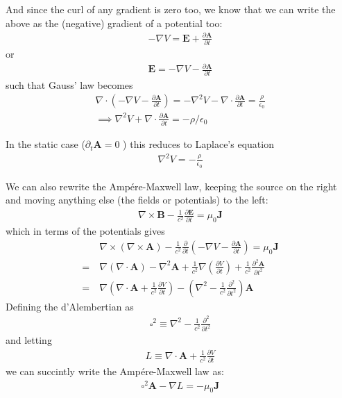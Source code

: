 And since the curl of any gradient is zero too, we know that we can write the above as the (negative) gradient of a potential too:
\begin{align*}
    - \nabla V = \mathbf{E} +\frac{\partial \mathbf{A}}{\partial t}
\end{align*}
or \begin{align*}
    \boxed{\mathbf{E} = -\nabla V - \frac{\partial \mathbf{A}}{\partial t}}
\end{align*}
such that Gauss' law becomes \begin{align*}
    \nabla \cdot \left( -\nabla V - \frac{\partial \mathbf{A}}{\partial t}  \right) = - \nabla^{2} V - \nabla \cdot \frac{\partial \mathbf{A}}{\partial t} = \frac{\rho}{\epsilon _0}\\
    \implies \nabla ^{2} V + \nabla \cdot \frac{\partial \mathbf{A}}{\partial t} = -\rho  /\epsilon_0
\end{align*}

In the static case (\(\partial _t \mathbf{A} = 0\) ) this reduces to Laplace's equation \begin{align*}
    \nabla ^{2} V = - \frac{\rho}{\epsilon _0}
\end{align*}

We can also rewrite the Ampére-Maxwell law, keeping the source on the right and moving anything else (the fields or potentials) to the left: \begin{align*}
    \nabla \times \mathbf{B} - \frac{1}{c^{2}} \frac{\partial \mathbf{E}}{\partial t} = \mu _0 \mathbf{J}
\end{align*}
which in terms of the potentials gives \begin{align*}
    &\nabla \times \left( \nabla \times \mathbf{A}\right) - \frac{1}{c^{2} } \frac{\partial}{\partial t} \left( -\nabla V - \frac{\partial \mathbf{A}}{\partial t}  \right)  = \mu _0 \mathbf{J}\\
    =\ &\nabla (\nabla \cdot \mathbf{A}) - \nabla ^{2} \mathbf{A} + \frac{1}{c^{2}}\nabla \left( \frac{\partial V}{\partial t}  \right) + \frac{1}{c^{2}}\frac{\partial^{2} \mathbf{A}}{\partial t^{2} } \\
    =\ &\nabla \left( \nabla \cdot \mathbf{A} + \frac{1}{c^{2} } \frac{\partial V}{\partial t} \right) - \left( \nabla ^{2} - \frac{1}{c^{2}} \frac{\partial^{2} }{\partial t^{2} }  \right)\mathbf{A}
\end{align*}
Defining the d'Alembertian as \begin{align*}
    \square^{2} \equiv \nabla ^{2} - \frac{1}{c^{2} }\frac{\partial ^{2}}{\partial t^{2} }  
\end{align*}
and letting \begin{align*}
    L \equiv \nabla \cdot \mathbf{A} + \frac{1}{c^{2} } \frac{\partial V}{\partial t} 
\end{align*}
we can succintly write the Ampére-Maxwell law as: \begin{align*}
    \boxed{\square^{2} \mathbf{A} - \nabla L = - \mu _0 \mathbf{J}}
\end{align*}

